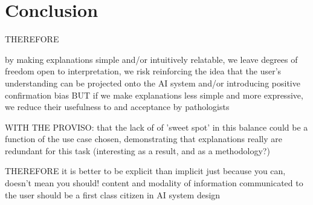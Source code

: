 




\section{Conclusion}

THEREFORE

by making explanations simple and/or intuitively relatable, we leave degrees of freedom open to interpretation, we risk reinforcing the idea that the user's understanding can be projected onto the AI system and/or introducing positive confirmation bias 
BUT
if we make explanations less simple and more expressive, we reduce their usefulness to and acceptance by pathologists

WITH THE PROVISO: that the lack of of 'sweet spot' in this balance could be a function of the use case chosen, demonstrating that explanations really are redundant for this task (interesting as a result, and as a methodology?)

THEREFORE
it is better to be explicit than implicit
just because you can, doesn't mean you should!
content and modality of information communicated to the user should be a first class citizen in AI system design

